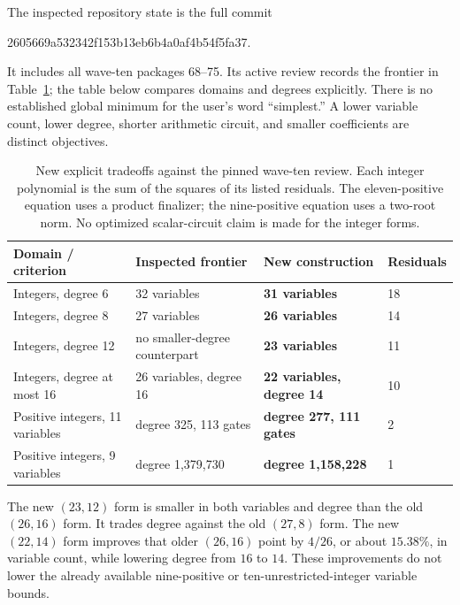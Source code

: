 \documentclass[11pt]{article}
\begin{document}
The inspected repository state is the full commit
\begin{center}\small\ttfamily
2605669a532342f153b13eb6b4a0af4b54f5fa37.
\end{center}
It includes all wave-ten packages 68--75. Its active review records the
frontier in Table~\ref{tab:frontier}; the table below compares domains and
degrees explicitly. There is no established global minimum for the user's
word ``simplest.'' A lower variable count, lower degree, shorter arithmetic
circuit, and smaller coefficients are distinct objectives.

\begin{table}[htbp]\centering\small
\begin{tabular}{@{}llll@{}}
\toprule
Domain / criterion & Inspected frontier & New construction & Residuals\\
\midrule
Integers, degree 6 & 32 variables & \textbf{31 variables} &18\\
Integers, degree 8 & 27 variables & \textbf{26 variables} &14\\
Integers, degree 12 & no smaller-degree counterpart & \textbf{23 variables} &11\\
Integers, degree at most 16 & 26 variables, degree 16 & \textbf{22 variables, degree 14} &10\\
Positive integers, 11 variables & degree 325, 113 gates & \textbf{degree 277, 111 gates} &2\\
Positive integers, 9 variables & degree 1,379,730 & \textbf{degree 1,158,228} &1\\
\bottomrule
\end{tabular}
\caption{New explicit tradeoffs against the pinned wave-ten review.
Each integer polynomial is the sum of the squares of its listed residuals.
The eleven-positive equation uses a product finalizer; the nine-positive
equation uses a two-root norm. No optimized scalar-circuit
claim is made for the integer forms.}\label{tab:frontier}
\end{table}

The new $(23,12)$ form is smaller in both variables and degree than the old
$(26,16)$ form. It trades degree against the old $(27,8)$ form.
The new $(22,14)$ form improves that older $(26,16)$ point by $4/26$, or
about $15.38\%$, in variable count, while lowering degree from $16$ to $14$. These improvements do not lower the
already available nine-positive or ten-unrestricted-integer variable bounds.
\end{document}
